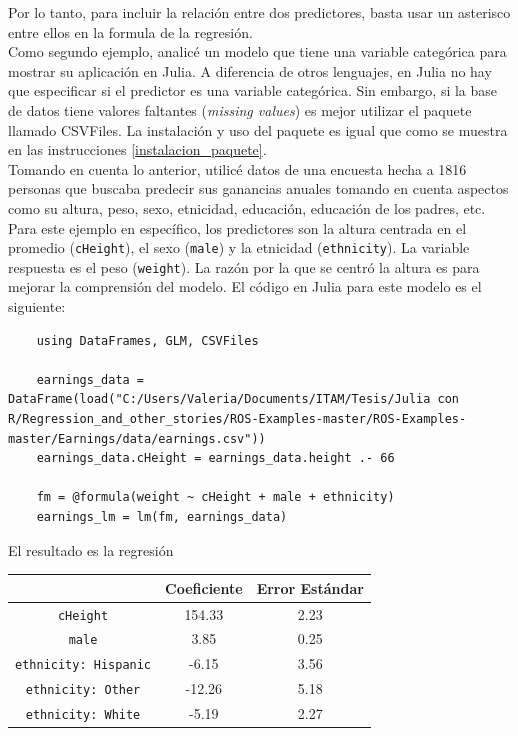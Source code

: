 Por lo tanto, para incluir la relación entre dos predictores, basta usar un asterisco entre ellos en la formula de la regresión. 
\\
Como segundo ejemplo, analicé un modelo que tiene una variable categórica para mostrar su aplicación en Julia. A diferencia de otros lenguajes, en Julia no hay que especificar si el predictor es una variable categórica. Sin embargo, si la base de datos tiene valores faltantes (\textit{missing values}) es mejor utilizar el paquete llamado \textsf{CSVFiles}. La instalación y uso del paquete es igual que como se muestra en las instrucciones \ref{instalacion_paquete}.  
\\
Tomando en cuenta lo anterior, utilicé datos de una encuesta hecha a 1816 personas que buscaba predecir sus ganancias anuales tomando en cuenta aspectos como su altura, peso, sexo, etnicidad, educación, educación de los padres, etc. Para este ejemplo en específico, los predictores son la altura centrada en el promedio (\texttt{cHeight}), el sexo (\texttt{male}) y la etnicidad (\texttt{ethnicity}). La variable respuesta es el peso (\texttt{weight}). La razón por la que se centró la altura es para mejorar la comprensión del modelo. El código en Julia para este modelo es el siguiente:

\begin{verbatim}
    using DataFrames, GLM, CSVFiles

    earnings_data = DataFrame(load("C:/Users/Valeria/Documents/ITAM/Tesis/Julia con R/Regression_and_other_stories/ROS-Examples-master/ROS-Examples-master/Earnings/data/earnings.csv"))
    earnings_data.cHeight = earnings_data.height .- 66

    fm = @formula(weight ~ cHeight + male + ethnicity)
    earnings_lm = lm(fm, earnings_data)

\end{verbatim}

El resultado es la regresión 


\begin{tabular}{|c|c|c|}
    \hline 
    \rule[-1ex]{0pt}{2.5ex}  & Coeficiente & Error Estándar \\ 
    \hline 
    \rule[-1ex]{0pt}{2.5ex} \texttt{cHeight} & 154.33 & 2.23 \\
    \hline 
    \rule[-1ex]{0pt}{2.5ex} \texttt{male} & 3.85 & 0.25 \\ 
    \hline 
    \rule[-1ex]{0pt}{2.5ex} \texttt{ethnicity: Hispanic} & -6.15 & 3.56 \\ 
    \hline 
    \rule[-1ex]{0pt}{2.5ex} \texttt{ethnicity: Other} & -12.26 & 5.18 \\ 
    \hline 
    \rule[-1ex]{0pt}{2.5ex} \texttt{ethnicity: White} & -5.19 & 2.27 \\ 
    \hline
\end{tabular}





